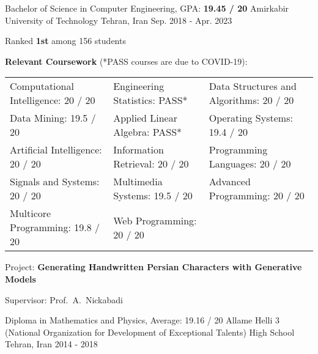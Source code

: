 \begin{cventries}
  \cventry
    {Bachelor of Science in Computer Engineering, GPA: \textbf{19.45 / 20}} %
    {Amirkabir University of Technology} %
    {Tehran, Iran} %
    {Sep. 2018 - Apr. 2023} %
    {
      \begin{cvitems}
        \item{Ranked \textbf{1st} among 156 students}
        \item{
          \textbf{Relevant Coursework} (*PASS courses are due to COVID-19):
          \smallskip
          \begin{adjustwidth}{4mm}{}
            \begin{tabular}{l@{\hskip 5mm}l@{\hskip 5mm}l}
              Computational Intelligence: 20 / 20 & Engineering Statistics: PASS*  & Data Structures and Algorithms: 20 / 20 \\
Data Mining: 19.5 / 20              & Applied Linear Algebra: PASS*  & Operating Systems: 19.4 / 20            \\
Artificial Intelligence: 20 / 20    & Information Retrieval: 20 / 20 & Programming Languages: 20 / 20          \\
Signals and Systems: 20 / 20        & Multimedia Systems: 19.5 / 20  & Advanced Programming: 20 / 20           \\
Multicore Programming: 19.8 / 20    & Web Programming: 20 / 20       &                                        
            \end{tabular}
          	\medskip
          \end{adjustwidth}
        }
        \item{
          Project: \textbf{Generating Handwritten Persian Characters with Generative Models}
        }
        \item{
          Supervisor: Prof.~A.~Nickabadi
        }
      \end{cvitems}
    }

  \cventry
    {Diploma in Mathematics and Physics, Average: 19.16 / 20} %
    {{\fontsize{9.8pt}{1em}\bodyfont Allame Helli 3 (National Organization for Development of Exceptional Talents) High School}}
    {Tehran, Iran} %
    {2014 - 2018} %
    {} \vspace*{-5mm}

\end{cventries}
